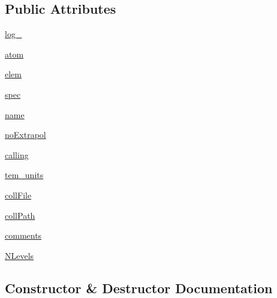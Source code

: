 \subsection*{Public Attributes}
\begin{DoxyCompactItemize}
\item 
\hyperlink{classpyneb_1_1core_1_1pynebcore_1_1___coll_data_ascii_afd87151907f32bc0dc45f0171b61374e}{log\+\_\+}
\item 
\hyperlink{classpyneb_1_1core_1_1pynebcore_1_1___coll_data_ascii_a0c5c7091b1d8a95d9bee2744d713f5c9}{atom}
\item 
\hyperlink{classpyneb_1_1core_1_1pynebcore_1_1___coll_data_ascii_a62e73dc66c7aff7941c5ce94e808c23a}{elem}
\item 
\hyperlink{classpyneb_1_1core_1_1pynebcore_1_1___coll_data_ascii_adaf1b66faf18504ec4b5c8c0b7f6763b}{spec}
\item 
\hyperlink{classpyneb_1_1core_1_1pynebcore_1_1___coll_data_ascii_ab74e6bf80237ddc4109968cedc58c151}{name}
\item 
\hyperlink{classpyneb_1_1core_1_1pynebcore_1_1___coll_data_ascii_a52e264b8c50ff2cf7d96c19e3f1e2a95}{no\+Extrapol}
\item 
\hyperlink{classpyneb_1_1core_1_1pynebcore_1_1___coll_data_ascii_ab25fa7ebe84b603684dee62410c1e34c}{calling}
\item 
\hyperlink{classpyneb_1_1core_1_1pynebcore_1_1___coll_data_ascii_a538e48ab1f2ca63dbe55abea69ca2242}{tem\+\_\+units}
\item 
\hyperlink{classpyneb_1_1core_1_1pynebcore_1_1___coll_data_ascii_ab1799c18dddda68ec8651caf93c90e40}{coll\+File}
\item 
\hyperlink{classpyneb_1_1core_1_1pynebcore_1_1___coll_data_ascii_adde256ff299a719e21c78ff9aad1b68c}{coll\+Path}
\item 
\hyperlink{classpyneb_1_1core_1_1pynebcore_1_1___coll_data_ascii_a64b8b36116751d566275b722e40bb3a7}{comments}
\item 
\hyperlink{classpyneb_1_1core_1_1pynebcore_1_1___coll_data_ascii_a4d45fe163c2108853ab418386bf4da56}{N\+Levels}
\end{DoxyCompactItemize}


\subsection{Constructor \& Destructor Documentation}
\hypertarget{classpyneb_1_1core_1_1pynebcore_1_1___coll_data_ascii_ac775ee34451fdfa742b318538164070e}{}
